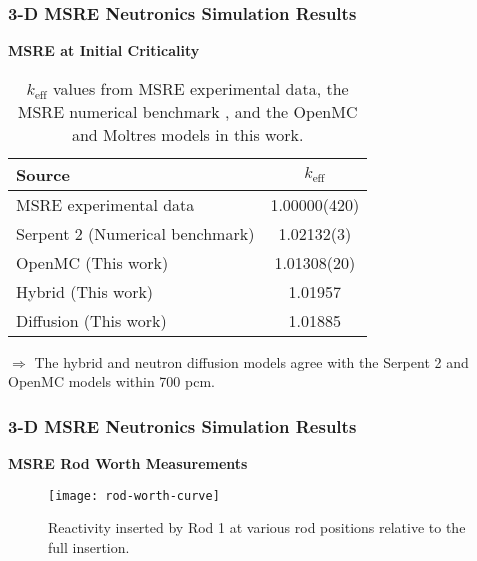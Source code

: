 \begin{frame}
  \frametitle{3-D MSRE Neutronics Simulation Results}
  \textbf{MSRE at Initial Criticality}
  \begin{table}[htb]
    \centering
    \caption{$k_\text{eff}$ values from \gls{MSRE} experimental data, the \gls{MSRE} numerical
    benchmark \cite{fratoni_molten_2020}, and the OpenMC and Moltres models in this work.}
    \begin{tabular}{l S[table-format=1.5(2)]}
      \toprule
      Source & {$k_\text{eff}$} \\
       \midrule
      \gls{MSRE} experimental data & 1.00000(420) \\
      Serpent 2 (Numerical benchmark) & 1.02132(3) \\
      OpenMC (This work) & 1.01308(20) \\
      Hybrid (This work) & 1.01957 \\
      Diffusion (This work) & 1.01885 \\
      \bottomrule
    \end{tabular}
    \label{table:initial-crit}
  \end{table}
  \vspace{.2cm}

  $\Rightarrow$ The hybrid and neutron diffusion models agree with the Serpent 2 and OpenMC models within
  700 pcm.
\end{frame}

\begin{frame}
  \frametitle{3-D MSRE Neutronics Simulation Results}
  \textbf{MSRE Rod Worth Measurements}
  \begin{figure}[t]
    \centering
    \texttt{[image: rod-worth-curve]}
    \caption{Reactivity inserted by Rod 1 at various rod positions relative to the full insertion.}
    \label{fig:rod-worth}
  \end{figure}
\end{frame}

